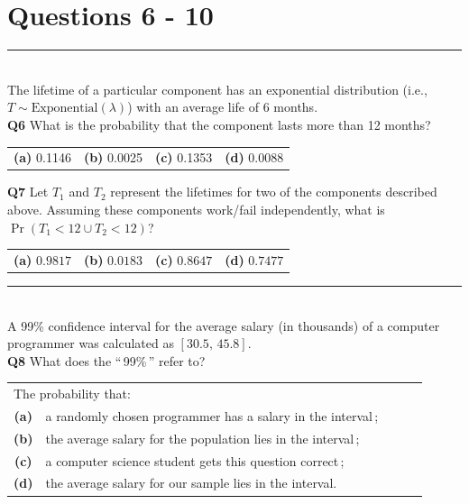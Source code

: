 \documentclass[12pt]{article}
\begin{document}
\newpage


\section*{Questions 6 - 10}



\rule{\linewidth}{1pt}
\quad\\
The lifetime of a particular component has an exponential distribution (i.e., $T \sim \text{Exponential}(\lambda)$) with an average life of 6 months.\\[0.3cm]
{\bf Q6} What is the probability that the component lasts more than 12 months? \\[0.2cm]
\begin{tabular}{cccc}
{\bf(a)} 0.1146 & {\bf(b)} 0.0025 & {\bf(c)} 0.1353 & {\bf(d)} 0.0088\\[0.6cm]
\end{tabular}

{\bf Q7} Let $T_1$ and $T_2$ represent the lifetimes for two of the components described above. Assuming these components work/fail independently, what is $\Pr(T_1 < 12 \cup T_2 < 12)$? \\[0.2cm]
\begin{tabular}{cccc}
{\bf(a)} $0.9817$ & {\bf(b)} $0.0183$ & {\bf(c)} $0.8647$  & {\bf(d)} $0.7477$ \\[0.6cm]
\end{tabular}


\rule{\linewidth}{1pt}
\quad\\
A 99\% confidence interval for the average salary (in thousands) of a computer programmer was calculated as $[30.5,\,45.8]$.\\[0.2cm]

{\bf Q8} What does the ``\,99\%\,'' refer to?\\[0.4cm]
\begin{tabular}{c@{\,\,\,}llll}
\multicolumn{2}{l}{\quad The probability that:}\\[0.2cm]
{\bf(a)} & a randomly chosen programmer has a salary in the interval\,;\\[0.2cm]
{\bf(b)} & the average salary for the population lies in the interval\,; \\[0.2cm]
{\bf(c)} & a computer science student gets this question correct\,; \\[0.2cm]
{\bf(d)} & the average salary for our sample lies in the interval. \\[0.6cm]
\end{tabular}
\end{document}
